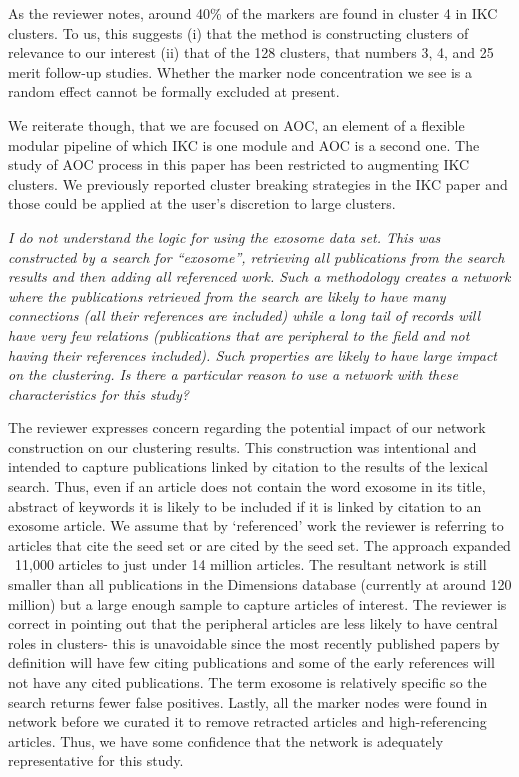 \documentclass[11pt, oneside]{article}   	%
\begin{document}
As the reviewer notes, around 40\% of the markers are found in cluster 4 in IKC clusters. To us, this suggests (i) that the method is constructing clusters of relevance to our interest
(ii) that of the 128 clusters, that numbers 3, 4, and 25 merit follow-up studies. Whether the marker node concentration we see is a random effect cannot be formally excluded at present.

We reiterate though, that we are focused on AOC, an element of a flexible modular pipeline of which IKC is one module and AOC is a second one. The study of AOC process in this paper has been restricted 
to augmenting IKC clusters. We previously reported cluster breaking strategies in the IKC paper and those could be applied at the user's discretion to large clusters.

\emph{I do not understand the logic for using the exosome data set. This was constructed by a search for “exosome”, retrieving all publications from the search results and then adding all referenced work. Such a methodology creates a network where the publications retrieved from the search are likely to have many connections (all their references are included) while a long tail of records will have very few relations (publications that are peripheral to the field and not having their references included). Such properties are likely to have large impact on the clustering. Is there a particular reason to use a network with these characteristics for this study?}

The reviewer expresses concern regarding the potential impact of our network construction on our clustering results.  This construction was intentional and intended to capture publications linked by citation to the results of the lexical search. Thus, even if an article does not contain the word exosome in its title, abstract of keywords it is likely to be included if it is linked by citation to an exosome article. We assume that by `referenced' work the reviewer is referring to articles that cite the seed set or are cited by the seed set. The approach expanded ~11,000 articles to just under 14 million articles. The resultant network is still smaller than all publications in the Dimensions database (currently at around 120 million) but a large enough sample to capture articles of interest. The reviewer is correct in pointing out that the peripheral articles are less likely to have central roles in clusters- this is unavoidable since the most recently published papers by definition will have few citing publications and some of the early references will not have any cited publications. The term exosome is relatively specific so the search returns fewer false positives. Lastly, all the marker nodes were found in network before we curated it to remove retracted articles and high-referencing articles. Thus, we have some confidence that the network is adequately representative for this study.  
\end{document}
